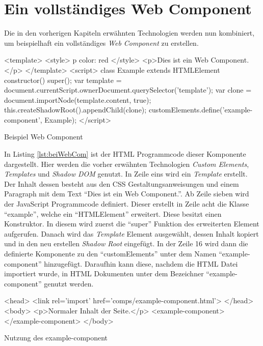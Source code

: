 \documentclass[12pt, paper=a4, bibtotoc, toc=listof, headsepline=true]{scrreprt}
\begin{document}
		\section{Ein vollständiges Web Component}
		Die in den vorherigen Kapiteln erwähnten Technologien werden nun kombiniert, um beispielhaft ein vollständiges \emph{Web Component} zu erstellen. 		\begin{listing}
			\begin{HTMLcode*}{}
<template>
   <style>
      p {color: red}
   </style>
   <p>Dies ist ein Web Component.</p>
</template>
<script>
   class Example extends HTMLElement {
      constructor() {
         super();
         var template = document.currentScript.ownerDocument.querySelector('template');
         var clone = document.importNode(template.content, true);
         this.createShadowRoot().appendChild(clone);
      }
   }
customElements.define('example-component', Example);
</script>
			\end{HTMLcode*}
			\caption{Beispiel Web Component}
			\label{lst:beiWebCom}
		\end{listing}
		In Listing \ref{lst:beiWebCom} ist der \ac{HTML} Programmcode dieser Komponente dargestellt. Hier werden die vorher erwähnten Technologien \emph{Custom Elements}, \emph{Templates} und \emph{Shadow DOM} genutzt. In Zeile eins wird ein \emph{Template} erstellt. Der Inhalt dessen besteht aus den \ac{CSS} Gestaltungsanweisungen und einem Paragraph mit dem Text \enquote{Dies ist ein Web Component.}. Ab Zeile sieben wird der JavaScript Programmcode definiert. Dieser erstellt in Zeile acht die Klasse \enquote{example}, welche ein \enquote{HTMLElement} erweitert. Diese besitzt einen Konstruktor. In diesem wird zuerst die \enquote{super} Funktion des erweiterten Element aufgerufen. Danach wird das \emph{Template} Element ausgewählt, dessen Inhalt kopiert und in den neu erstellen \emph{Shadow Root} eingefügt. In der Zeile 16 wird dann die definierte Komponente zu den \enquote{customElements} unter dem Namen \enquote{example-component} hinzugefügt. Daraufhin kann diese, nachdem die \ac{HTML} Datei importiert wurde, in \ac{HTML} Dokumenten unter dem Bezeichner \enquote{example-component} genutzt werden.
\begin{listing}[H]
	\begin{HTMLcode*}{}
<head>
   <link rel='import' href='comps/example-component.html'>
</head>
<body>
   <p>Normaler Inhalt der Seite.</p>
   <example-component></example-component>
</body>
	\end{HTMLcode*}
	\caption{Nutzung des example-component}
	\label{lst:nutExaCom}
\end{listing}
\end{document}
